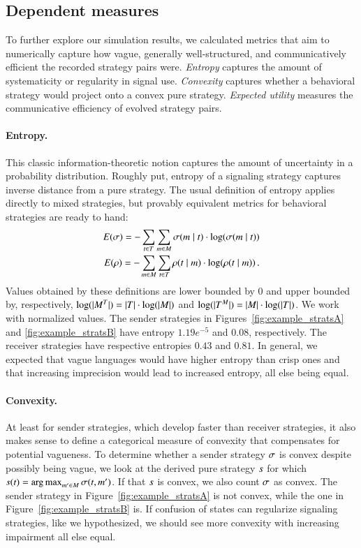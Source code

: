 \documentclass[fleqn,reqno,10pt]{article}
\begin{document}
\subsection{Dependent measures}
 
To further explore our simulation results, we calculated metrics that aim to numerically
capture how vague, generally well-structured, and communicatively efficient the recorded
strategy pairs were. \emph{Entropy} captures the amount of systematicity or regularity in
signal use. \emph{Convexity} captures whether a behavioral strategy would project onto a convex
pure strategy. \emph{Expected utility} measures the communicative efficiency of evolved
strategy pairs.

\paragraph{Entropy.} This classic information-theoretic notion
captures the amount of uncertainty in a probability
distribution. Roughly put, entropy of a signaling strategy captures
inverse distance from a pure strategy. The usual definition of entropy
applies directly to mixed strategies, but provably equivalent metrics
for behavioral strategies are ready to hand:
\begin{align*}
  E(\sigma) = -\sum_{t \in T} \sum_{m \in M}
  \sigma(m \mid t) \cdot \log(\sigma(m \mid
  t)) \\
  E(\rho) = -\sum_{m \in M} \sum_{t \in T}
  \rho(t \mid m) \cdot \log(\rho(t \mid
  m)) \,. 
\end{align*}
Values obtained by these definitions are lower bounded by $0$ and
upper bounded by, respectively, $\log(|M^T|) = |T|
\cdot \log(|M|)$ and $\log(|T^M|) = |M| \cdot
\log(|T|)$. We work with normalized values. The sender
strategies in Figures~\ref{fig:example_stratsA} and
\ref{fig:example_stratsB} have entropy $1.19e^{-5}$ and $0.08$,
respectively. The receiver strategies have respective entropies $0.43$
and $0.81$. In general, we expected that vague languages would have
higher entropy than crisp ones and that increasing imprecision would
lead to increased entropy, all else being equal.

\paragraph{Convexity.} At least for sender strategies, which develop faster than receiver
strategies, it also makes sense to define a categorical measure of convexity that compensates
for potential vagueness. To determine whether a sender strategy $\sigma$ is convex despite
possibly being vague, we look at the derived pure strategy $s$ for which
$s(t) = \operatorname*{arg\,max}_{m' \in M} \sigma(t,m')$. If that $s$ is
convex, we also count $\sigma$ as convex. The sender strategy in
Figure~\ref{fig:example_stratsA} is not convex, while the one in
Figure~\ref{fig:example_stratsB} is.  If confusion of states can regularize signaling
strategies, like we hypothesized, we should see more convexity with increasing impairment all
else equal.
\end{document}
